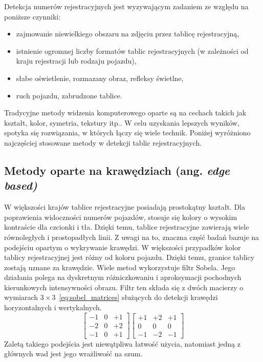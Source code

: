 Detekcja numerów rejestracyjnych jest wyzywającym zadaniem ze względu na poniższe czynniki:
\begin{itemize}
    \item zajmowanie niewielkiego obszaru na zdjęciu przez tablicę rejestracyjną,
    \item istnienie ogromnej liczby formatów tablic rejestracyjnych (w zależności od kraju rejestracji lub rodzaju pojazdu),
    \item słabe oświetlenie, rozmazany obraz, refleksy świetlne,
    \item ruch pojazdu, zabrudzone tablice.
\end{itemize}
Tradycyjne metody widzenia komputerowego oparte są na cechach takich jak kształt, kolor, symetria, tekstury itp.\cite{9310202}.
W celu uzyskania lepszych wyników, spotyka się rozwiązania, w których łączy się wiele technik.
Poniżej wyróżniono najczęściej stosowane metody w detekcji tablic rejestracyjnych.

\subsection{Metody oparte na krawędziach (ang. \textit{edge based)}}
\label{subsec:edge-based}
W większości krajów tablice rejestracyjne posiadają prostokątny kształt.
Dla poprawienia widoczności numerów pojazdów, stosuje się kolory o wysokim kontraście dla czcionki i tła.
Dzięki temu, tablice rejestracyjne zawierają wiele równoległych i prostopadłych linii.
Z uwagi na to, znaczna część badań bazuje na podejściu opartym o wykrywanie krawędzi.
W większości przypadków kolor tablicy rejestracyjnej jest różny od koloru pojazdu.
Dzięki temu, granice tablicy zostają uznane za krawędzie.
Wiele metod wykorzystuje filtr Sobela.
Jego działania polega na dyskretnym różniczkowaniu i aproksymacji pochodnych kierunkowych intensywności obrazu.
Filtr ten składa się z dwóch macierzy o wymiarach $3\times3$~\eqref{eq:sobel_matrices} służących do detekcji krawędzi horyzontalnych i wertykalnych.
\begin{equation}
    \begin{bmatrix}
        -1 & 0 & +1 \\
        -2 & 0 & +2 \\
        -1 & 0 & +1
    \end{bmatrix}
%
    \begin{bmatrix}
        +1 & +2 & +1 \\
        0  & 0  & 0  \\
        -1 & -2 & -1
    \end{bmatrix}
    \label{eq:sobel_matrices}
\end{equation}
Zaletą takiego podejścia jest niewątpliwa łatwość użycia, natomiast jedną z głównych wad jest jego wrażliwość na szum.

